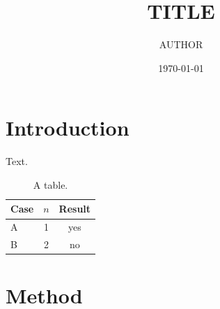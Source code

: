 \documentclass[10pt,twocolumn]{article}
\title{{{TITLE}}}
\author{{{AUTHOR}}}
\date{\today}
\theoremstyle{plain}
\theoremstyle{definition}
\theoremstyle{remark}
\begin{document}
\section{Introduction}
Text.
\begin{table}[t]
\centering
\begin{tabular}{lcc}\toprule
Case & $n$ & Result \\\midrule
A & 1 & yes \\
B & 2 & no \\\bottomrule
\end{tabular}
\caption{A table.}
\end{table}
\section{Method}


\end{document}
